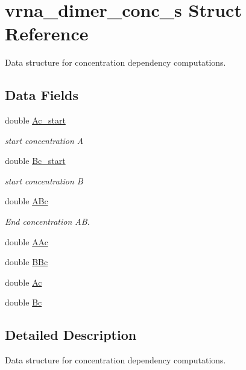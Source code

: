 \hypertarget{structvrna__dimer__conc__s}{}\section{vrna\+\_\+dimer\+\_\+conc\+\_\+s Struct Reference}
\label{structvrna__dimer__conc__s}


Data structure for concentration dependency computations.  


\subsection*{Data Fields}
\begin{DoxyCompactItemize}
\item 
double \mbox{\hyperlink{structvrna__dimer__conc__s_a6e64ce1afbc93756afef06c0e3ccce97}{Ac\+\_\+start}}
\begin{DoxyCompactList}\small\item\em start concentration A \end{DoxyCompactList}\item 
double \mbox{\hyperlink{structvrna__dimer__conc__s_a5763381efee22a0bbec2f2d0754f7697}{Bc\+\_\+start}}
\begin{DoxyCompactList}\small\item\em start concentration B \end{DoxyCompactList}\item 
double \mbox{\hyperlink{structvrna__dimer__conc__s_aef56a1fe8d7f07e7b5d9a65417dda8a4}{A\+Bc}}
\begin{DoxyCompactList}\small\item\em End concentration AB. \end{DoxyCompactList}\item 
double \mbox{\hyperlink{structvrna__dimer__conc__s_a217db3b506d42fa8517f907b28aa231e}{A\+Ac}}
\item 
double \mbox{\hyperlink{structvrna__dimer__conc__s_a413bc4b0ed1eea92655033862ed6d1da}{B\+Bc}}
\item 
double \mbox{\hyperlink{structvrna__dimer__conc__s_a7d9f7bec4f51476ed1a5cfee673d61b4}{Ac}}
\item 
double \mbox{\hyperlink{structvrna__dimer__conc__s_a96eb62519e39a224240ad93ad89e4570}{Bc}}
\end{DoxyCompactItemize}


\subsection{Detailed Description}
Data structure for concentration dependency computations. 

